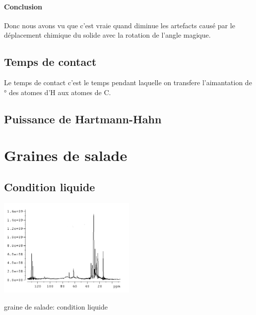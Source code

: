 \documentclass[a4paper,12pt]{scrartcl}
\begin{document}
   \paragraph{Conclusion}
    Donc nous avons vu que c'est vraie quand diminue les artefacts causé par le déplacement chimique du solide avec la rotation de l'angle magique. 

  \subsection{Temps de contact}
   Le temps de contact c'est le temps pendant laquelle on transfere l'aimantation de \unit[90]{\degree} des atomes d'H aux atomes de C.

  \subsection{Puissance de Hartmann-Hahn}
 
 

 \section{Graines de salade}
  \subsection{Condition liquide}
 \begin{figurehere}
    \center
    \includegraphics[width=0.5\textwidth]{bilder/graine_liquide.png}
    \caption{graine de salade: condition liquide}
   \end{figurehere}
\end{document}
